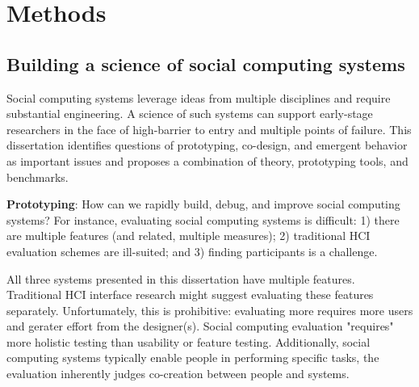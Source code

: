 

\section{Methods} 

\subsection{Building a science of social computing systems}
Social computing systems leverage ideas from multiple disciplines and require substantial engineering. A science of such systems can support early-stage researchers in the face of high-barrier to entry and multiple points of failure. This dissertation identifies questions of prototyping, co-design, and emergent behavior as important issues and proposes a combination of theory, prototyping tools, and benchmarks. 


\textbf{Prototyping}: How can we rapidly build, debug, and improve social computing systems? For instance, evaluating social computing systems is difficult: 1) there are multiple features (and related, multiple measures); 2) traditional HCI evaluation schemes are ill-suited; and 3) finding participants is a challenge.

All three systems presented in this dissertation have multiple features. Traditional HCI interface research might suggest evaluating these features separately. Unfortumately, this is prohibitive: evaluating more requires more users and gerater effort from the designer(s). Social computing evaluation "requires" more holistic testing than usability or feature testing. Additionally, social computing systems typically enable people in performing specific tasks, the evaluation inherently judges co-creation between people and systems.

